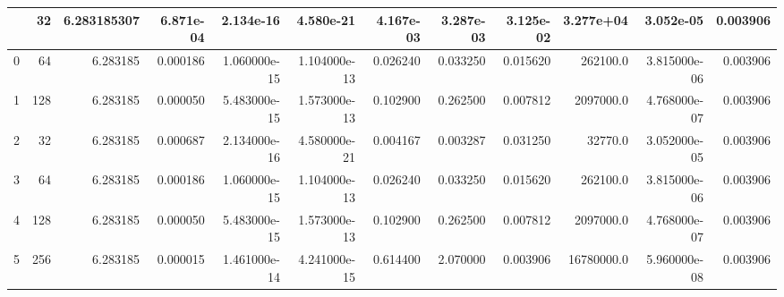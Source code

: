 \begin{tabular}{lrrrrrrrrrrr}
\toprule
{} &   32 &  6.283185307 &  6.871e-04 &     2.134e-16 &     4.580e-21 &  4.167e-03 &  3.287e-03 &  3.125e-02 &   3.277e+04 &     3.052e-05 &  0.003906 \\
\midrule
0 &   64 &     6.283185 &   0.000186 &  1.060000e-15 &  1.104000e-13 &   0.026240 &   0.033250 &   0.015620 &    262100.0 &  3.815000e-06 &  0.003906 \\
1 &  128 &     6.283185 &   0.000050 &  5.483000e-15 &  1.573000e-13 &   0.102900 &   0.262500 &   0.007812 &   2097000.0 &  4.768000e-07 &  0.003906 \\
2 &   32 &     6.283185 &   0.000687 &  2.134000e-16 &  4.580000e-21 &   0.004167 &   0.003287 &   0.031250 &     32770.0 &  3.052000e-05 &  0.003906 \\
3 &   64 &     6.283185 &   0.000186 &  1.060000e-15 &  1.104000e-13 &   0.026240 &   0.033250 &   0.015620 &    262100.0 &  3.815000e-06 &  0.003906 \\
4 &  128 &     6.283185 &   0.000050 &  5.483000e-15 &  1.573000e-13 &   0.102900 &   0.262500 &   0.007812 &   2097000.0 &  4.768000e-07 &  0.003906 \\
5 &  256 &     6.283185 &   0.000015 &  1.461000e-14 &  4.241000e-15 &   0.614400 &   2.070000 &   0.003906 &  16780000.0 &  5.960000e-08 &  0.003906 \\
\bottomrule
\end{tabular}
